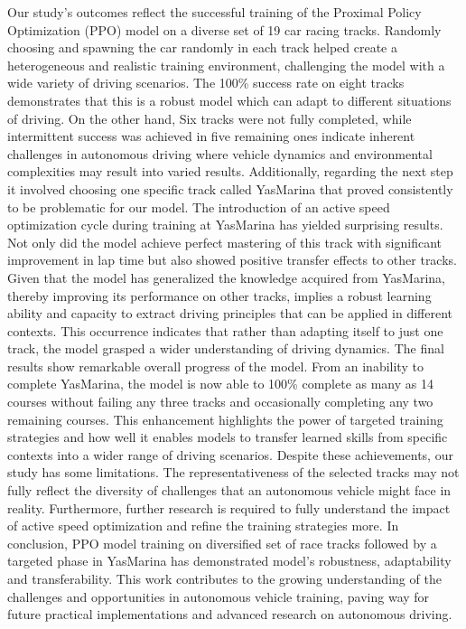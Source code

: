 \documentclass[conference]{IEEEtran}
\begin{document}
Our study’s outcomes reflect the successful training of the Proximal Policy Optimization (PPO) model on a diverse set of 19 car racing tracks. Randomly choosing and spawning the car randomly in each track helped create a heterogeneous and realistic training environment, challenging the model with a wide variety of driving scenarios.
The 100\% success rate on eight tracks demonstrates that this is a robust model which can adapt to different situations of driving. On the other hand, Six tracks were not fully completed, while intermittent success was achieved in five remaining ones indicate inherent challenges in autonomous driving where vehicle dynamics and environmental complexities may result into varied results.
Additionally, regarding the next step it involved choosing one specific track called YasMarina that proved consistently to be problematic for our model. The introduction of an active speed optimization cycle during training at YasMarina has yielded surprising results. Not only did the model achieve perfect mastering of this track with significant improvement in lap time but also showed positive transfer effects to other tracks.
Given that the model has generalized the knowledge acquired from YasMarina, thereby improving its performance on other tracks, implies a robust learning ability and capacity to extract driving principles that can be applied in different contexts. This occurrence indicates that rather than adapting itself to just one track, the model grasped a wider understanding of driving dynamics.
The final results show remarkable overall progress of the model. From an inability to complete YasMarina, the model is now able to 100\% complete as many as 14 courses without failing any three tracks and occasionally completing any two remaining courses. This enhancement highlights the power of targeted training strategies and how well it enables models to transfer learned skills from specific contexts into a wider range of driving scenarios.
Despite these achievements, our study has some limitations. The representativeness of the selected tracks may not fully reflect the diversity of challenges that an autonomous vehicle might face in reality. Furthermore, further research is required to fully understand the impact of active speed optimization and refine the training strategies more.
In conclusion, PPO model training on diversified set of race tracks followed by a targeted phase in YasMarina has demonstrated model’s robustness, adaptability and transferability. This work contributes to the growing understanding of the challenges and opportunities in autonomous vehicle training, paving way for future practical implementations and advanced research on autonomous driving.



\end{document}

